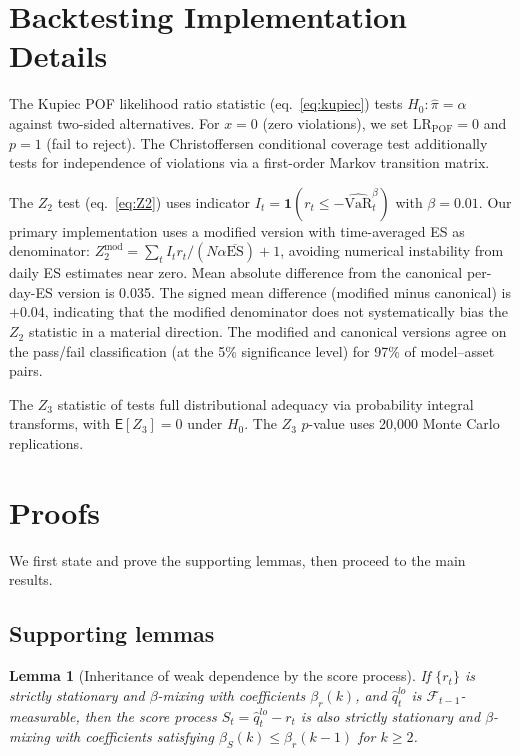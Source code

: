 \documentclass[preprint,11pt,authoryear]{elsarticle}
\newtheorem{lemma}[theorem]{Lemma}
\newcommand{\VaR}{\mathrm{VaR}}
\newcommand{\ES}{\mathrm{ES}}
\newcommand{\E}{\mathsf{E}}
\newcommand{\1}{\boldsymbol{1}}
\begin{document}
	\section{Backtesting Implementation Details}
	\label{app:backtesting}
	
	The Kupiec POF likelihood ratio statistic (eq.~\ref{eq:kupiec})
	tests $H_0: \hat\pi = \alpha$ against two-sided alternatives.
	For $x=0$ (zero violations), we set $\mathrm{LR}_{\mathrm{POF}}=0$
	and $p=1$ (fail to reject). The Christoffersen conditional coverage
	test \citep{christoffersen1998} additionally tests for independence
	of violations via a first-order Markov transition matrix.
	
	The $Z_2$ test (eq.~\ref{eq:Z2}) uses indicator
	$I_t = \1(r_t \leq -\widehat{\VaR}_t^\beta)$ with $\beta = 0.01$.
	Our primary implementation uses a modified version with
	time-averaged ES as denominator:
	$Z_2^{\text{mod}} = \sum_t I_t r_t / (N\alpha\overline{\ES}) + 1$,
	avoiding numerical instability from daily ES estimates near zero.
	Mean absolute difference from the canonical per-day-ES version
	is 0.035. The signed mean difference (modified minus canonical) is $+0.04$, indicating that the modified denominator does not systematically bias the $Z_2$ statistic in a material direction. The modified and canonical versions agree on the pass/fail classification (at the 5\% significance level) for 97\% of model--asset pairs.
	
	The $Z_3$ statistic of \citet{acerbi2014back} tests full
	distributional adequacy via probability integral transforms, with
	$\E[Z_3] = 0$ under $H_0$. The $Z_3$ $p$-value uses 20,000 Monte
	Carlo replications.
	
	\section{Proofs}
	\label{app:proofs}
	
	We first state and prove the supporting lemmas, then proceed to the main results.
	
	\subsection{Supporting lemmas}
	
	\begin{lemma}[Inheritance of weak dependence by the score process]
		\label{lem:score_mixing}
		If $\{r_t\}$ is strictly stationary and $\beta$-mixing with coefficients $\beta_r(k)$, and $\hat q_t^{lo}$ is $\mathcal F_{t-1}$-measurable, then the score process $S_t=\hat q_t^{lo}-r_t$ is also strictly stationary and $\beta$-mixing with coefficients satisfying $\beta_S(k) \le \beta_r(k-1)$ for $k \ge 2$.
	\end{lemma}
	
\end{document}
